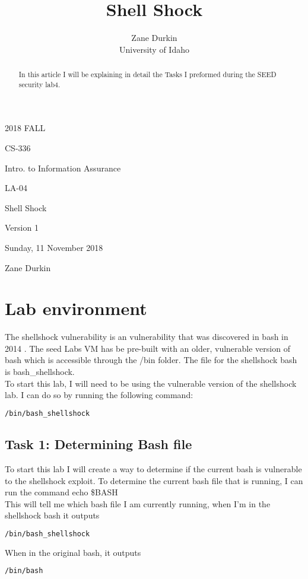 \documentclass[14pt]{extarticle}
\begin{document}
\title{Shell Shock}

\author{Zane Durkin\\
    University of Idaho}
\begin{description}[leftmargin=!, labelwidth=\widthof{\bfseries Author(s) Name(s)}]
\item [Year and Semester] 2018 FALL
\item [Course Number] CS-336
\item [Course Title] Intro. to Information Assurance
\item [Work Number] LA-04
\item [Work Name] Shell Shock
\item [Work Version] Version 1
\item [Long Date] Sunday, 11 November 2018
\item [Author(s) Name(s)] Zane Durkin
\end{description}
\begin{abstract}
In this article I will be explaining in detail the Tasks I preformed during the SEED security lab4.
\end{abstract}

\setcounter{section}{-1}
\section{Lab environment}
The shellshock vulnerability is an vulnerability that was discovered in bash in 2014 \cite{seed-shellshock}.
The seed Labs VM has be pre-built with an older, vulnerable version of bash which is accessible through the /bin folder.
The file for the shellshock bash is bash\_shellshock.\\
To start this lab, I will need to be using the vulnerable version of the shellshock lab. I can do so by running the following command:
\begin{lstlisting}[language=sh]
/bin/bash_shellshock
\end{lstlisting}

\subsection{Task 1: Determining Bash file}
To start this lab I will create a way to determine if the current bash is vulnerable to the shellshock exploit.
To determine the current bash file that is running, I can run the command echo \$BASH\\
This will tell me which bash file I am currently running, when I'm in the shellshock bash it outputs
\begin{lstlisting}[language=sh]
/bin/bash_shellshock
\end{lstlisting}
When in the original bash, it outputs
\begin{lstlisting}[language=sh]
/bin/bash
\end{lstlisting}
\end{document}
